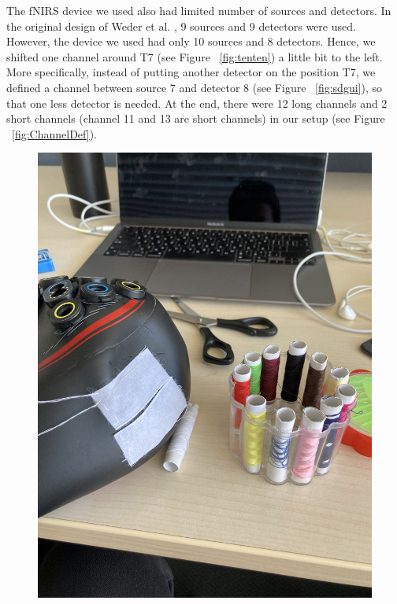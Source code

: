 The fNIRS device we used also had limited number of sources and detectors. In the original design of Weder et al. \citeyearpar{Weder2018}, 9 sources and 9 detectors were used. However, the device we used had only 10 sources and 8 detectors. Hence, we shifted one channel around T7 (see Figure ~\ref{fig:tenten}) a little bit to the left. More specifically, instead of putting another detector on the position T7, we defined a channel between source 7 and detector 8 (see Figure ~\ref{fig:sdgui}), so that one less detector is needed. At the end, there were 12 long channels and 2 short channels (channel 11 and 13 are short channels) in our setup (see Figure ~\ref{fig:ChannelDef}).

\newpage


\begin{figure}[H]
\centering
\begin{minipage}[c]{.4\linewidth}
  \centering
  \includegraphics[scale= 0.06, angle= -90, origin= c]{bilder/IMG_9825.jpg}

\end{minipage}
\end{figure}
